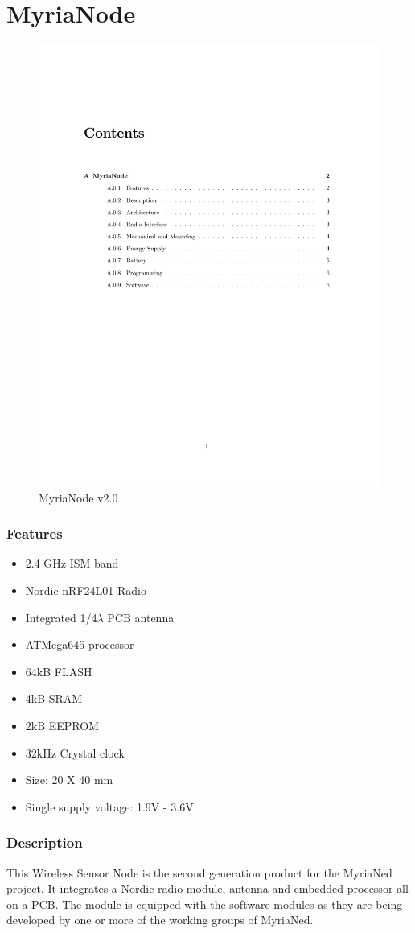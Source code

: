 \documentclass[a4paper,11pt]{report}
\begin{document}
\tableofcontents
\appendix
\chapter{MyriaNode}
\begin{figure}[!h]
 \centering
\includegraphics[width=0.5 \textwidth]{myrianode}
\caption{MyriaNode v2.0}
\label{myrianode}
\end{figure}
\subsection{Features}
\begin{itemize}
 \item 2.4 GHz ISM band
 \item Nordic nRF24L01 Radio
 \item Integrated 1/4$\lambda$ PCB antenna
 \item ATMega645 processor
 \item 64kB FLASH
 \item 4kB SRAM
 \item 2kB EEPROM
 \item 32kHz Crystal clock
 \item Size: 20 X 40 mm
 \item Single supply voltage: 1.9V - 3.6V
\end{itemize}
\subsection{Description}
This Wireless Sensor Node is the second generation product for the MyriaNed project. It integrates a Nordic radio module, antenna and embedded processor
all on a PCB. The module is equipped with the software modules as they are being developed by one or more of the working groups of MyriaNed.
\end{document}
